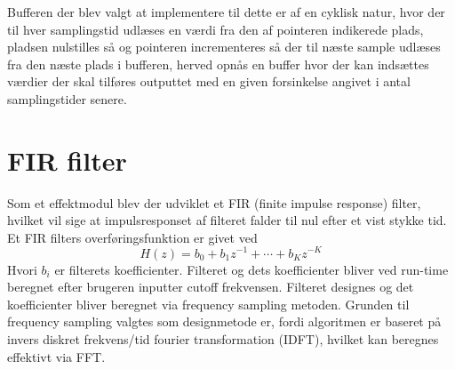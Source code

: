 Bufferen der blev valgt at implementere til dette er af en cyklisk natur, hvor der til hver samplingstid udlæses en værdi fra den af pointeren indikerede plads, pladsen nulstilles så og pointeren incrementeres så der til næste sample udlæses fra den næste plads i bufferen, herved opnås en buffer hvor der kan indsættes værdier der skal tilføres outputtet med en given forsinkelse angivet i antal samplingstider senere. 



\section{FIR filter}
Som et effektmodul blev der udviklet et FIR (finite impulse response) filter, hvilket vil sige at impulsresponset af filteret falder til nul efter et vist stykke tid.\newline
Et FIR filters overføringsfunktion er givet ved
\begin{equation}
H(z) = b_0 + b_1z^{-1} + \cdots + b_Kz^{-K}
\end{equation}
Hvori $b_i$ er filterets koefficienter.\cite[p.218]{Tan2013}\newline
Filteret og dets koefficienter bliver ved run-time beregnet efter brugeren inputter cutoff frekvensen. Filteret designes og det koefficienter bliver beregnet via frequency sampling metoden.
Grunden til frequency sampling valgtes som designmetode er, fordi algoritmen er baseret på invers diskret frekvens/tid fourier transformation (IDFT), hvilket kan beregnes effektivt via FFT.\newline
